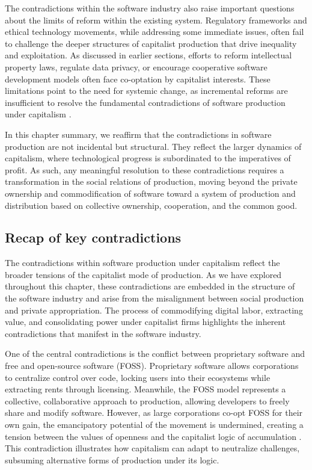 \begin{refsection}
The contradictions within the software industry also raise important questions about the limits of reform within the existing system. Regulatory frameworks and ethical technology movements, while addressing some immediate issues, often fail to challenge the deeper structures of capitalist production that drive inequality and exploitation. As discussed in earlier sections, efforts to reform intellectual property laws, regulate data privacy, or encourage cooperative software development models often face co-optation by capitalist interests. These limitations point to the need for systemic change, as incremental reforms are insufficient to resolve the fundamental contradictions of software production under capitalism \cite[pp.~245-247]{foster2009}.

In this chapter summary, we reaffirm that the contradictions in software production are not incidental but structural. They reflect the larger dynamics of capitalism, where technological progress is subordinated to the imperatives of profit. As such, any meaningful resolution to these contradictions requires a transformation in the social relations of production, moving beyond the private ownership and commodification of software toward a system of production and distribution based on collective ownership, cooperation, and the common good.

\subsection{Recap of key contradictions}

The contradictions within software production under capitalism reflect the broader tensions of the capitalist mode of production. As we have explored throughout this chapter, these contradictions are embedded in the structure of the software industry and arise from the misalignment between social production and private appropriation. The process of commodifying digital labor, extracting value, and consolidating power under capitalist firms highlights the inherent contradictions that manifest in the software industry.

One of the central contradictions is the conflict between proprietary software and free and open-source software (FOSS). Proprietary software allows corporations to centralize control over code, locking users into their ecosystems while extracting rents through licensing. Meanwhile, the FOSS model represents a collective, collaborative approach to production, allowing developers to freely share and modify software. However, as large corporations co-opt FOSS for their own gain, the emancipatory potential of the movement is undermined, creating a tension between the values of openness and the capitalist logic of accumulation \cite[pp.~88-90]{raymond2022}. This contradiction illustrates how capitalism can adapt to neutralize challenges, subsuming alternative forms of production under its logic.


\end{refsection}
